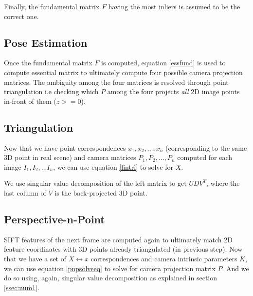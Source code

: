 \documentclass[11pt, a4paper, openany]{article}
\begin{document}
Finally, the fundamental matrix $F$ having the most inliers is assumed to be the correct one.
\subsection{Pose Estimation} Once the fundamental matrix $F$ is computed, equation \eqref{essfund} is used to compute essential matrix to ultimately compute four possible camera projection matrices. The ambiguity among the four matrices is resolved through point triangulation i.e checking which $P$ among the four projects \textit{all} 2D image points in-front of them ($z >= 0$).

\subsection{Triangulation} Now that we have point correspondences $x_{1}, x_{2}, \ldots , x_{n}$ (corresponding to the same 3D point in real scene) and camera matrices $P_{1}, P_{2}, \ldots , P_{n}$ computed for each image $I_{1}, I_{2}, \ldots I_{n}$, we can use equation \eqref{lintri} to solve for $X$.

We use singular value decomposition of the left matrix to get $UDV^{T}$, where the last column of $V$ is the back-projected 3D point.

\subsection{Perspective-n-Point} SIFT features of the next frame are computed again to ultimately match 2D feature coordinates with 3D points already triangulated (in previous step).\newline
Now that we have a set of $X \leftrightarrow x$ correspondences and camera intrinsic parameters $K$, we can use equation \eqref{pnpsolveeq} to solve for camera projection matrix $P$. And we do so using, again, singular value decomposition as explained in section \ref{ssec:num1}.
\end{document}
